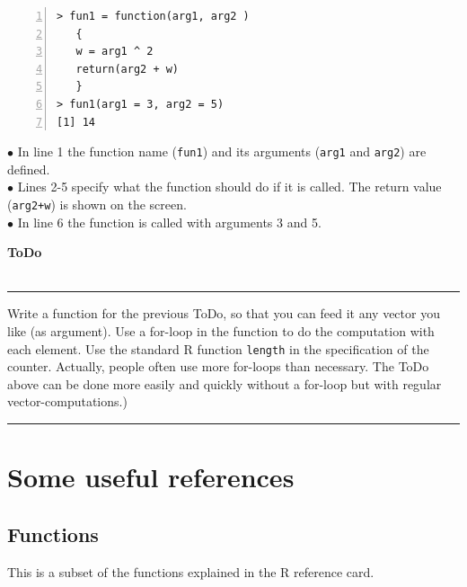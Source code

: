 \documentclass[a4paper,11pt,twocolumn,tablecaptionabove]{scrartcl}
\makeatletter
\newenvironment{ToDo} {%
  \begin{flushright}
    \hfill
    \begin{minipage}{0.95\columnwidth}         %
    \textsf{\textbf{ToDo}} \\
      \vspace{-0.85cm}\\
      {\color{Gray}\rule[-0.1cm]{\columnwidth}{1.5pt}}} { %
      {\color{Gray} \rule[0.3cm]{\columnwidth}{1.5pt}}
    \end{minipage}
    \vspace{1em}
  \end{flushright}
  }
\let\SF@@footnote\footnote
\def\footnote{\ifx\protect\@typeset@protect
 \expandafter\SF@@footnote
 \else
 \expandafter\SF@gobble@opt
 \fi
}
\edef\SF@gobble@opt{\noexpand\protect
 \expandafter\noexpand\csname SF@gobble@opt \endcsname}
\makeatother
\begin{document}
\begin{Verbatim}[frame=single,numbers=left,gobble=0, xleftmargin=0.35cm, numbersep=0.1cm]
> fun1 = function(arg1, arg2 )
   {
   w = arg1 ^ 2
   return(arg2 + w)
   }
> fun1(arg1 = 3, arg2 = 5) 
[1] 14

\end{Verbatim}

\noindent $\bullet$ In line 1 the function name (\texttt{fun1}) and its arguments (\texttt{arg1} and \texttt{arg2}) are defined. \\
\noindent $\bullet$ Lines 2-5 specify what the function should do if it is called. The return value (\texttt{arg2+w}) is shown on the screen. \\
\noindent $\bullet$ In line 6 the function is called with arguments 3 and 5.

\begin{ToDo}
Write a function for the previous ToDo, so that you can feed it any vector you like (as argument). Use a for-loop in the function to do the computation with each element. Use the standard R function \texttt{length} in the specification of the counter. \footnote{Actually, people often use more for-loops than necessary. The ToDo above can be done more easily and quickly without a for-loop but with regular vector-computations.})
\end{ToDo}

\newpage


\section{Some useful references}

\subsection{Functions}

This is a subset of the functions explained in the R reference card.\\
\end{document}
